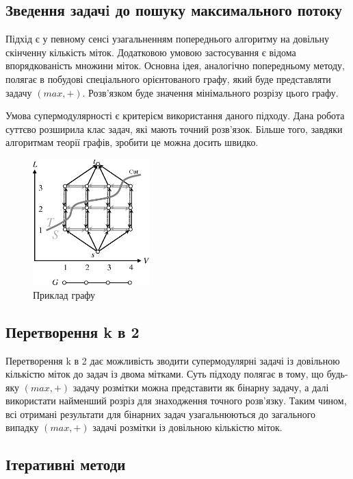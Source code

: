 \subsection{Зведення задачi до пошуку максимального потоку}

Підхід \cite{ishikawa} є у певному сенсі узагальненням попереднього алгоритму на довільну
скінченну кількість міток. Додатковою умовою застосування є відома впорядкованість
множини міток. Основна ідея, аналогічно попередньому методу, полягає в побудові
спеціального орієнтованого графу, який буде представляти задачу \((max,+)\).
Розв'язком буде значення мінімального розрізу цього графу.

Умова супермодулярності є критерієм використання даного підходу. Дана робота
суттєво розширила клас задач, які мають точний розв'язок. Більше того, завдяки
алгоритмам теорії графів, зробити це можна досить швидко.

\begin{figure}[h]
  \centering
  \includegraphics[width=0.4\textwidth]{images/ishikawa_graph.png}
  \caption{Приклад графу}
  \label{fig:graph_example}
\end{figure}


\subsection{Перетворення k в 2}

Перетворення k в 2 \cite{k22} дає можливість зводити супермодулярні задачі із 
довільною кількістю міток до задач із двома мітками.
Суть підходу полягає в тому, що будь-яку \((max,+)\) задачу розмітки можна 
представити як бінарну задачу, а далі використати найменший розріз для знаходження 
точного розв'язку. Таким чином, всі отримані результати для бінарних задач
узагальнюються до загального випадку \((max,+)\) задачі розмітки із довільною
кількістю міток.

\subsection{Ітеративні методи}

